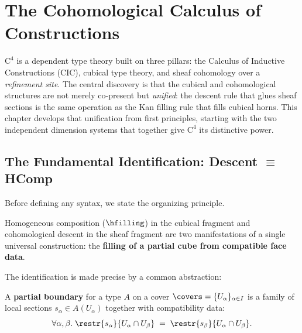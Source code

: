 
\chapter{The Cohomological Calculus of Constructions}
\label{ch:c4-calculus}

$\mathrm{C}^4$ is a dependent type theory built on three pillars:
the Calculus of Inductive Constructions (CIC), cubical type theory,
and sheaf cohomology over a \emph{refinement site}.  The central
discovery is that the cubical and cohomological structures are not
merely co-present but \emph{unified}: the descent rule that glues
sheaf sections is the same operation as the Kan filling rule that
fills cubical horns.  This chapter develops that unification from first
principles, starting with the two independent dimension systems that
together give $\mathrm{C}^4$ its distinctive power.


\section{The Fundamental Identification: Descent \(\equiv\) HComp}
\label{sec:descent-hcomp-id}

Before defining any syntax, we state the organizing principle.

\begin{theorem}
\label{thm:fundamental-id}
Homogeneous composition (\(\hfilling\)) in the cubical fragment and
cohomological descent in the sheaf fragment are two manifestations of
a single universal construction: the \textbf{filling of a partial cube
from compatible face data}.
\end{theorem}

The identification is made precise by a common abstraction:

\begin{definition}
A \textbf{partial boundary} for a type \(A\) on a cover
\(\covers = \{U_\alpha\}_{\alpha \in I}\) is a family of local sections
\(s_\alpha \in A(U_\alpha)\) together with compatibility data:
\[
  \forall \alpha, \beta.\;
  \restr{s_\alpha}{U_\alpha \cap U_\beta}
  \;=\;
  \restr{s_\beta}{U_\alpha \cap U_\beta}.
\]
\end{definition}

